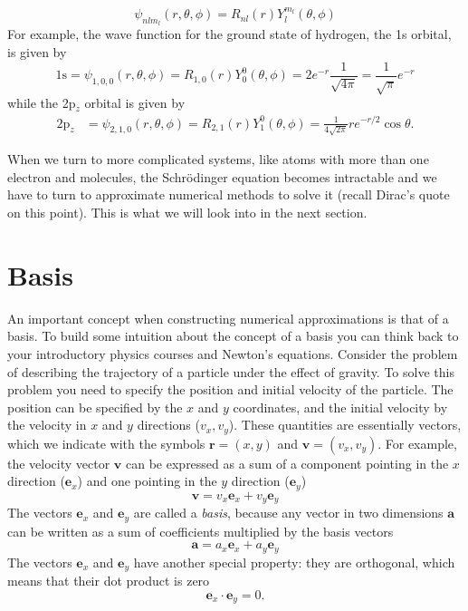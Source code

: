 \documentclass[../Main/chem371-notes.tex]{subfiles}
\begin{document}
\begin{equation}
\psi_{nlm_l}(r,\theta,\phi) = R_{nl}(r) Y_l^{m_l}(\theta,\phi)
\end{equation}
For example, the wave function for the  ground state of hydrogen, the 1s orbital, is given by
\begin{equation}
\mathrm{1s} = \psi_{1,0,0}(r,\theta,\phi) = R_{1,0}(r) Y_0^0(\theta,\phi) = 2 e^{-r} \frac{1}{\sqrt{4\pi}} = \frac{1}{\sqrt{\pi}} e^{-r}
\end{equation}
while the 2p$_{z}$ orbital is given by
\begin{align}
\mathrm{2p}_{z} &= \psi_{2,1,0}(r,\theta,\phi) = R_{2,1}(r) Y_1^{0}(\theta,\phi) =
\frac{1}{4\sqrt{2 \pi}}   r e^{-r/2} \cos \theta.
\end{align}

When we turn to more complicated systems, like atoms with more than one electron and molecules, the Schr\"{o}dinger equation becomes intractable and we have to turn to approximate numerical methods to solve it (recall Dirac's quote on this point).
This is what we will look into in the next section.

\section{Basis}
An important concept when constructing numerical approximations is that of a basis.
To build some intuition about the concept of a basis you can think back to your introductory physics courses and Newton's equations.
Consider the problem of describing the trajectory of a particle under the effect of gravity.
To solve this problem you need to specify the position and initial velocity of the particle.
The position can be specified by the $x$ and $y$ coordinates, and the initial velocity by the velocity in $x$ and $y$ directions ($v_x, v_y$).
These quantities are essentially vectors, which we indicate with the symbols $\mathbf{r} = (x,y)$ and $\mathbf{v} = (v_x,v_y)$. For example, the velocity vector $\mathbf{v}$ can be expressed as a sum of a component pointing in the $x$ direction ($\mathbf{e}_x$) and one pointing in the $y$ direction ($\mathbf{e}_y$)
\begin{equation}
\mathbf{v} = v_x \mathbf{e}_x + v_y \mathbf{e}_y
\end{equation}
The vectors $\mathbf{e}_x$ and $\mathbf{e}_y$ are called a \emph{basis}, because any vector in two dimensions $\mathbf{a}$ can be written as a sum of coefficients multiplied by the basis vectors
\begin{equation}
\mathbf{a} = a_x \mathbf{e}_x + a_y \mathbf{e}_y
\end{equation}
The vectors $\mathbf{e}_x$ and $\mathbf{e}_y$ have another special property: they are orthogonal, which means that their dot product is zero
\begin{equation}
 \mathbf{e}_x \cdot \mathbf{e}_y = 0.
\end{equation}
\end{document}
